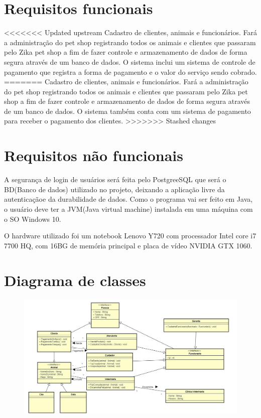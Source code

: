 \documentclass[12pt]{article}
\begin{document}
 \section{Requisitos funcionais}%
<<<<<<< Updated upstream
 Cadastro de clientes, animais e funcionários. Fará a administração do pet shop registrando todos os animais e clientes que passaram pelo Zika pet shop a fim de fazer controle e armazenamento de dados de forma segura através de um banco de dados. O sistema inclui um sistema de controle de pagamento que registra a forma de pagamento e o valor do serviço sendo cobrado.
=======
 Cadastro de clientes, animais e funcionários. Fará a administração do pet shop registrando todos os animais e clientes que passaram pelo Zika pet shop a fim de fazer controle e armazenamento de dados de forma segura através de um banco de dados. O sistema também conta com um sistema de pagamento para receber o pagamento dos clientes.
>>>>>>> Stashed changes
 
 
 \section{Requisitos não funcionais}%
 A segurança de login de usuários será feita pelo PostgreeSQL que será o BD(Banco de dados) utilizado no projeto, deixando a aplicação livre da autenticaçãoe da durabilidade de dados. Como o programa vai ser feito em Java, o usuário deve ter a JVM(Java virtual machine) instalada em uma máquina com o SO Windows 10.
 
 O hardware utilizado foi um notebook Lenovo Y720 com processador Intel core i7 7700 HQ, com 16BG de memória principal e placa de vídeo NVIDIA GTX 1060.
 
 

 \section{Diagrama de classes}
 \begin{flushleft}
 
 \begin{figure}[!h]
     \centering
     \includegraphics[scale=0.43,angle=90]{Diagrama.jpg}
\end{figure}
 \end{flushleft} 
\end{document}
